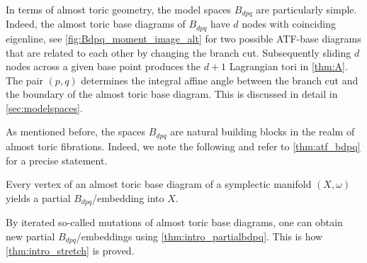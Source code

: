 \documentclass[12pt,a4paper,abstract=true,final]{scrartcl}
\begin{document}
In terms of almost toric geometry, the model spaces $B_{dpq}$ are particularly simple.
Indeed, the almost toric base diagrams of $B_{dpq}$ have $d$ nodes with coinciding eigenline, see \cref{fig:Bdpq_moment_image_alt} for two possible ATF-base diagrams that are related to each other by changing the branch cut. Subsequently sliding $d$ nodes across a given base point produces the $d+1$ Lagrangian tori in \cref{thm:A}.
The pair $(p,q)$ determines the integral affine angle between the branch cut and the boundary of the almost toric base diagram.
This is discussed in detail in \cref{sec:modelspaces}.

As mentioned before, the spaces $B_{dpq}$ are natural building blocks in the realm of almost toric fibrations.
Indeed, we note the following and refer to \cref{thm:atf_bdpq} for a precise statement.

\begin{proposition}
    \label{thm:intro_partialbdpq}
    Every vertex of an almost toric base diagram of a symplectic manifold $(X,\omega)$ yields a partial $B_{dpq}$\-/embedding into $X$. 
\end{proposition}

By iterated so-called mutations of almost toric base diagrams, one can obtain new partial $B_{dpq}$\-/embeddings using \cref{thm:intro_partialbdpq}.
This is how \cref{thm:intro_stretch} is proved.
\end{document}
